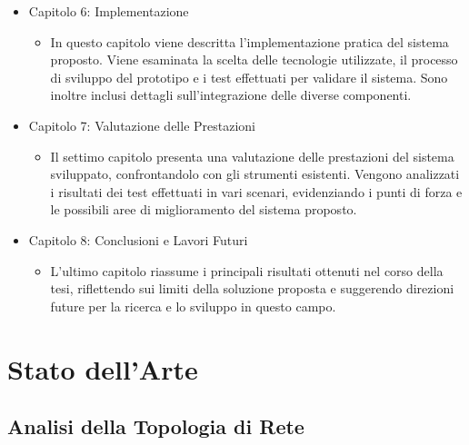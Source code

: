 \documentclass[target=bach,aauheader=,style=]{thud}
\begin{document}
\begin{itemize}
  \item Capitolo 6: Implementazione
    \begin{itemize}
      \item In questo capitolo viene descritta l'implementazione pratica del sistema proposto. Viene esaminata la scelta delle tecnologie utilizzate, il processo di sviluppo del prototipo e i test effettuati per validare il sistema. Sono inoltre inclusi dettagli sull'integrazione delle diverse componenti.
    \end{itemize}

  \item Capitolo 7: Valutazione delle Prestazioni
    \begin{itemize}
      \item Il settimo capitolo presenta una valutazione delle prestazioni del sistema sviluppato, confrontandolo con gli strumenti esistenti. Vengono analizzati i risultati dei test effettuati in vari scenari, evidenziando i punti di forza e le possibili aree di miglioramento del sistema proposto.
    \end{itemize}

  \item Capitolo 8: Conclusioni e Lavori Futuri
    \begin{itemize}
      \item L'ultimo capitolo riassume i principali risultati ottenuti nel corso della tesi, riflettendo sui limiti della soluzione proposta e suggerendo direzioni future per la ricerca e lo sviluppo in questo campo.
    \end{itemize}

\end{itemize}


\chapter{Stato dell'Arte}
\label{art}
\section{Analisi della Topologia di Rete}
\end{document}
